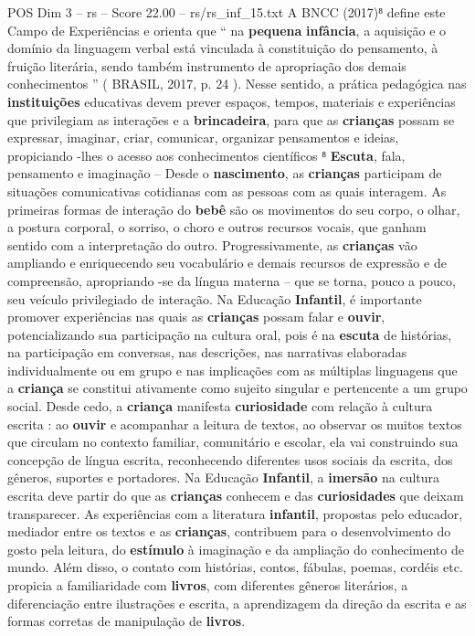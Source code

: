 \begin{textsample}{POS Dim 3 – rs – Score 22.00 – rs/rs\_inf\_15.txt}
A BNCC (2017)⁸ define este Campo de Experiências e orienta que “ na \textbf{pequena} \textbf{infância}, a aquisição e o domínio da linguagem verbal está vinculada à constituição do pensamento, à fruição literária, sendo também instrumento de apropriação dos demais conhecimentos ” ( BRASIL, 2017, p. 24 ).
Nesse sentido, a prática pedagógica nas \textbf{instituições} educativas devem prever espaços, tempos, materiais e experiências que privilegiam as interações e a \textbf{brincadeira}, para que as \textbf{crianças} possam se expressar, imaginar, criar, comunicar, organizar pensamentos e ideias, propiciando -lhes o acesso aos conhecimentos científicos ⁸ \textbf{Escuta}, fala, pensamento e imaginação – Desde o \textbf{nascimento}, as \textbf{crianças} participam de situações comunicativas cotidianas com as pessoas com as quais interagem.
As primeiras formas de interação do \textbf{bebê} são os movimentos do seu corpo, o olhar, a postura corporal, o sorriso, o choro e outros recursos vocais, que ganham sentido com a interpretação do outro.
Progressivamente, as \textbf{crianças} vão ampliando e enriquecendo seu vocabulário e demais recursos de expressão e de compreensão, apropriando -se da língua materna – que se torna, pouco a pouco, seu veículo privilegiado de interação.
Na Educação \textbf{Infantil}, é importante promover experiências nas quais as \textbf{crianças} possam falar e \textbf{ouvir}, potencializando sua participação na cultura oral, pois é na \textbf{escuta} de histórias, na participação em conversas, nas descrições, nas narrativas elaboradas individualmente ou em grupo e nas implicações com as múltiplas linguagens que a \textbf{criança} se constitui ativamente como sujeito singular e pertencente a um grupo social.
Desde cedo, a \textbf{criança} manifesta \textbf{curiosidade} com relação à cultura escrita : ao \textbf{ouvir} e acompanhar a leitura de textos, ao observar os muitos textos que circulam no contexto familiar, comunitário e escolar, ela vai construindo sua concepção de língua escrita, reconhecendo diferentes usos sociais da escrita, dos gêneros, suportes e portadores.
Na Educação \textbf{Infantil}, a \textbf{imersão} na cultura escrita deve partir do que as \textbf{crianças} conhecem e das \textbf{curiosidades} que deixam transparecer.
As experiências com a literatura \textbf{infantil}, propostas pelo educador, mediador entre os textos e as \textbf{crianças}, contribuem para o desenvolvimento do gosto pela leitura, do \textbf{estímulo} à imaginação e da ampliação do conhecimento de mundo.
Além disso, o contato com histórias, contos, fábulas, poemas, cordéis etc. propicia a familiaridade com \textbf{livros}, com diferentes gêneros literários, a diferenciação entre ilustrações e escrita, a aprendizagem da direção da escrita e as formas corretas de manipulação de \textbf{livros}.

\end{textsample}
